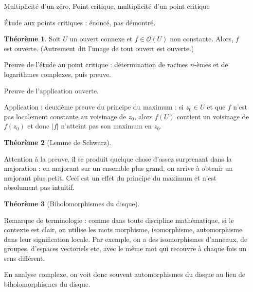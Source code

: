 \documentclass[11pt,a4paper]{book}
\theoremstyle{definition}
\newtheorem{theoreme}{Th\'eor\`eme}[section]
\theoremstyle{plain}
\begin{document}

Multiplicité d'un zéro, 
Point critique, multiplicité d'un point critique

Étude aux points critiques : énoncé, pas démontré.

\begin{theoreme}
Soit $U$ un ouvert connexe et $f\in \mathcal O(U)$ non constante.
Alors, $f$ est ouverte. 
(Autrement dit l'image de tout ouvert est ouverte.)
\end{theoreme}



Preuve de l'étude au point critique : détermination de racines $n$-èmes et de logarithmes complexes, puis preuve.

Preuve de l'application ouverte.

Application : deuxième preuve du principe du maximum : si $z_0 \in U$ et que $f$ n'est pas localement constante au voisinage de $z_0$, alors $f(U)$ contient un voisinage de $f(z_0)$ et donc $|f|$ n'atteint pas son maximum en $z_0$.


\begin{theoreme}[Lemme de Schwarz]
\end{theoreme}

Attention à la preuve, il se produit quelque chose d'assez surprenant dans la majoration : en majorant sur un ensemble plus grand,  on arrive à obtenir un majorant plus petit. Ceci est un effet du principe du maximum et n'est absolument pas intuitif.



\begin{theoreme}[Biholomorphismes du disque]
\end{theoreme}

Remarque de terminologie : comme dans toute discipline mathématique, si le contexte est clair, on utilise les mots \og morphisme\fg, \og isomorphisme\fg, \og automorphisme\fg{} dans leur signification \og locale\fg. Par exemple, on a des isomorphismes d'anneaux, de groupes, d'espaces vectoriels etc, avec le même mot qui recouvre à chaque fois un sens différent.

En analyse complexe, on voit donc souvent \og automorphismes du disque\fg{} au lieu de \og biholomorphismes du disque\fg.
\end{document}
